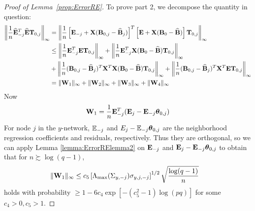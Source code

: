 \begin{proof}[Proof of Lemma~\ref{prop:ErrorRE}]
To prove part 2, we decompose the quantity in question:
%
\begin{align}\label{eqn:ErrorRElemma2maineqn}
\left\| \frac{1}{n} \widehat {{\mathbf{E}}}_{-j}^T \widehat {{\mathbf{E}}} {\mathbf{T}}_{0,j} \right\|_\infty &=
\left\| \frac{1}{n} \left[ {\mathbf{E}}_{-j} + {\mathbf{X}} ({\mathbf{B}}_{0,j} - \widehat {{\mathbf{B}}}_j) \right]^T \left[ {\mathbf{E}} + {\mathbf{X}} ({\mathbf{B}}_0 - \widehat {{\mathbf{B}}}) \right] {\mathbf{T}}_{0,j} \right\|_\infty \notag\\
& \leq \left\| \frac{1}{n} {\mathbf{E}}_{-j}^T {\mathbf{E}} {\mathbf{T}}_{0,j} \right\|_\infty +
\left\| \frac{1}{n} {\mathbf{E}}_{-j}^T {\mathbf{X}} ({\mathbf{B}}_0 - \widehat {{\mathbf{B}}}) {\mathbf{T}}_{0,j} \right\|_\infty \notag\\
& + \left\| \frac{1}{n} ({\mathbf{B}}_{0,j} - \widehat {{\mathbf{B}}}_j)^T {\mathbf{X}}^T {\mathbf{X}} ({\mathbf{B}}_0 - \widehat {{\mathbf{B}}}) {\mathbf{T}}_{0,j} \right\|_\infty +
\left\| \frac{1}{n} ({\mathbf{B}}_{0,j} - \widehat {{\mathbf{B}}}_j)^T {\mathbf{X}}^T {\mathbf{E}} {\mathbf{T}}_{0,j} \right\|_\infty \notag\\
&= \| {\mathbf{W}}_1 \|_\infty + \| {\mathbf{W}}_2 \|_\infty + \| {\mathbf{W}}_3 \|_\infty + \| {\mathbf{W}}_4 \|_\infty
\end{align}
%
Now
%
$$
{\mathbf{W}}_1 = \frac{1}{n} {\mathbf{E}}_{-j}^T ( {\mathbf{E}}_j - {\mathbf{E}}_{-j} {\boldsymbol{\theta}}_{0,j})
$$
%
For node $j$ in the $y$-network, ${\mathbb{E}}_{-j}$ and $E_j - {\mathbb{E}}_{-j} {\boldsymbol{\theta}}_{0,j}$ are the neighborhood regression coefficients and residuals, respectively. Thus they are orthogonal, so we can apply Lemma \ref{lemma:ErrorRElemma2} on ${\mathbf{E}}_{-j}$ and ${\mathbf{E}}_j - {\mathbf{E}}_{-j} {\boldsymbol{\theta}}_{0,j}$ to obtain that for $n \succsim \log (q-1)$,
%
\begin{align}\label{eqn:ErrorRElemma2eqn5}
\| {\mathbf{W}}_1 \|_\infty & \leq c_5 \left[ \Lambda_{\max} ( \Sigma_{y,-j}) \sigma_{y,j,-j} \right]^{1/2} \sqrt{\frac{\log(q-1)}{n}}
\end{align}
%
holds with probability $\geq 1 - 6c_4 \exp [-(c_5^2-1) \log(pq)]$ for some $c_4 > 0, c_5 > 1$.
%


\end{proof}
